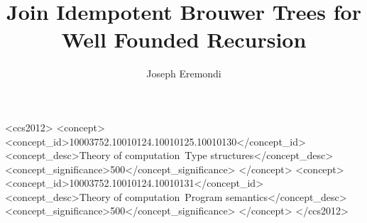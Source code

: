 \documentclass[dvipsnames,sigplan,10pt,anonymous,review]{acmart}\settopmatter{printfolios=true,printccs=false,printacmref=false}
\begin{document}
\title{Join Idempotent Brouwer Trees for Well Founded Recursion}


  \author{Joseph Eremondi}





\renewcommand{\shortauthors}{Joseph Eremondi, Ronald Garcia, and \'Eric Tanter}




\begin{abstract}
  
\end{abstract}

\begin{CCSXML}
<ccs2012>
<concept>
<concept_id>10003752.10010124.10010125.10010130</concept_id>
<concept_desc>Theory of computation~Type structures</concept_desc>
<concept_significance>500</concept_significance>
</concept>
<concept>
<concept_id>10003752.10010124.10010131</concept_id>
<concept_desc>Theory of computation~Program semantics</concept_desc>
<concept_significance>500</concept_significance>
</concept>
</ccs2012>
\end{CCSXML}
\end{document}
